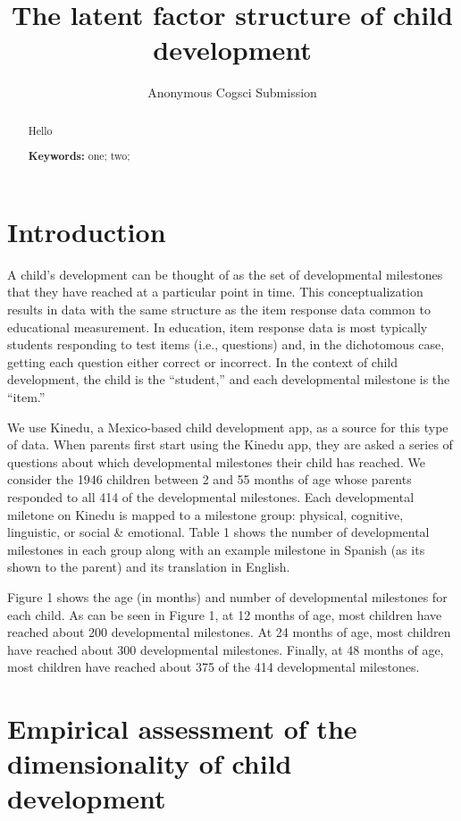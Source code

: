 \documentclass[10pt, letterpaper]{article}
\title{The latent factor structure of child development}
\author{Anonymous Cogsci Submission}
\begin{document}
\maketitle

\begin{abstract}
Hello

\textbf{Keywords:}
one; two;
\end{abstract}

\hypertarget{introduction}{%
\section{Introduction}\label{introduction}}

A child's development can be thought of as the set of developmental
milestones that they have reached at a particular point in time. This
conceptualization results in data with the same structure as the item
response data common to educational measurement. In education, item
response data is most typically students responding to test items (i.e.,
questions) and, in the dichotomous case, getting each question either
correct or incorrect. In the context of child development, the child is
the ``student,'' and each developmental milestone is the ``item.''

We use Kinedu, a Mexico-based child development app, as a source for
this type of data. When parents first start using the Kinedu app, they
are asked a series of questions about which developmental milestones
their child has reached. We consider the 1946 children between 2 and 55
months of age whose parents responded to all 414 of the developmental
milestones. Each developmental miletone on Kinedu is mapped to a
milestone group: physical, cognitive, linguistic, or social \&
emotional. Table 1 shows the number of developmental milestones in each
group along with an example milestone in Spanish (as its shown to the
parent) and its translation in English.

Figure 1 shows the age (in months) and number of developmental
milestones for each child. As can be seen in Figure 1, at 12 months of
age, most children have reached about 200 developmental milestones. At
24 months of age, most children have reached about 300 developmental
milestones. Finally, at 48 months of age, most children have reached
about 375 of the 414 developmental milestones.

\hypertarget{empirical-assessment-of-the-dimensionality-of-child-development}{%
\section{Empirical assessment of the dimensionality of child
development}\label{empirical-assessment-of-the-dimensionality-of-child-development}}
\end{document}
